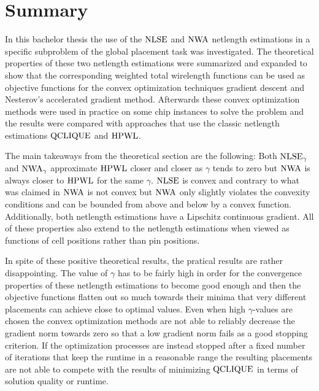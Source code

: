 \chapter{Summary} \label{chap:summary}

In this bachelor thesis the use of the \(\operatorname{NLSE}\) and \(\operatorname{NWA}\) netlength estimations
in a specific subproblem of the global placement task was investigated.
The theoretical properties of these two netlength estimations were summarized
and expanded to show that the corresponding weighted total wirelength functions
can be used as objective functions for the convex optimization techniques
gradient descent and Nesterov's accelerated gradient method.
Afterwards these convex optimization methods were used in practice on some chip instances
to solve the problem and the results were compared
with approaches that use the classic netlength estimations \(\operatorname{QCLIQUE}\) and \(\operatorname{HPWL}\).

The main takeaways from the theoretical section are the following:
Both \(\operatorname{NLSE}_\gamma\) and \(\operatorname{NWA}_\gamma\) approximate \(\operatorname{HPWL}\)
closer and closer as \(\gamma\) tends to zero
but \(\operatorname{NWA}\) is always closer to \(\operatorname{HPWL}\) for the same \(\gamma\).
\(\operatorname{NLSE}\) is convex and contrary to what was claimed in \cite{HsuChangBalabanov-AnalyticalPlacementFor3dIcDesigns} \(\operatorname{NWA}\) is not convex
but \(\operatorname{NWA}\) only slightly violates the convexity conditions and can be bounded from above and below by a convex function.
Additionally, both netlength estimations have a Lipschitz continuous gradient.
All of these properties also extend to the netlength estimations when viewed as functions
of cell positions rather than pin positions.

In spite of these positive theoretical results, the pratical results are rather disappointing.
The value of \(\gamma\) has to be fairly high in order for the convergence properties
of these netlength estimations to become good enough and then the objective functions
flatten out so much towards their minima that very different placements can achieve close to optimal values.
Even when high \(\gamma\)-values are chosen the convex optimization methods
are not able to reliably decrease the gradient norm towards zero
so that a low gradient norm fails as a good stopping criterion.
If the optimization processes are instead stopped after a fixed number of iterations
that keep the runtime in a reasonable range the resulting placements
are not able to compete with the results of minimizing \(\operatorname{QCLIQUE}\)
in terms of solution quality or runtime.

